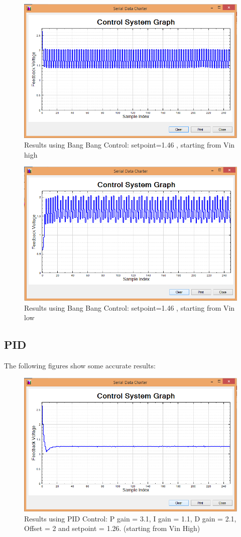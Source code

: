 \documentclass[11pt]{article}
\begin{document}
	\begin{figure}[H]\centering
	\includegraphics[height=0.5\textwidth]{images/BBh146.png}
	\caption{Results using Bang Bang Control: setpoint=1.46 , starting from Vin high}
		\label{bang_bang_h}
	\end{figure}
	
	\begin{figure}[H]\centering
	\includegraphics[height=0.5\textwidth]{images/BBl146.png}
	\caption{Results using Bang Bang Control: setpoint=1.46 , starting from Vin low}
		\label{bang_bang_l}
	\end{figure}

	
\subsection{PID}
The following figures show some accurate results:

	\begin{figure}[H]\centering
	\includegraphics[height=0.5\textwidth]{images/P3-1I1-1D1-2H1-26O2.png}
	\caption{Results using PID Control: P gain = 3.1, I gain = 1.1, D gain = 2.1, Offset = 2 and setpoint = 1.26. (starting from Vin High)}
		\label{PID}
	\end{figure}
\end{document}
